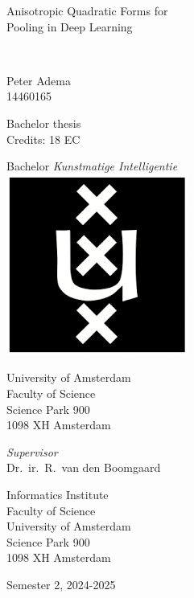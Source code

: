 \documentclass[a4paper, 12pt]{report}
\newcommand{\theTitle}{Anisotropic Quadratic Forms for \\
\vspace{0.5em}
Pooling in Deep Learning}
\newcommand{\theSubTitle}{}
\newcommand{\theAuthor}{Peter Adema}
\newcommand{\theStudentID}{14460165}
\newcommand{\theSupervisor}{Dr.\ ir.\ R.\ van den Boomgaard} %
\newcommand{\theInstitute}{
Informatics Institute \\ %
Faculty of Science\\
University of Amsterdam\\
Science Park 900 \\ 
1098 XH Amsterdam 
}
\newcommand{\theDate}{Semester 2, 2024-2025}
\begin{document}
\pagestyle{empty}
\begin{center}

\vspace{2.5cm}


\begin{Huge}
\theTitle
\end{Huge} \\

\vspace{0.5 cm}

\begin{Large}
\theSubTitle
\end{Large}

\vspace{1.5cm}

\theAuthor\\
\theStudentID

\vspace{1.5cm}

Bachelor thesis\\
Credits: 18 EC

\vspace{0.5cm}

Bachelor \textit{Kunstmatige Intelligentie} \\
\vspace{0.25cm}
\includegraphics[width=0.075\paperwidth]{figures/uva_logo} \\
\vspace{0.1cm}

University of Amsterdam\\
Faculty of Science\\
Science Park 900\\
1098 XH Amsterdam

\vspace{2cm}

\emph{Supervisor}\\

\theSupervisor

\vspace{0.25cm}

\theInstitute

\vspace{1.0cm}

\theDate

\end{center}
\end{document}
